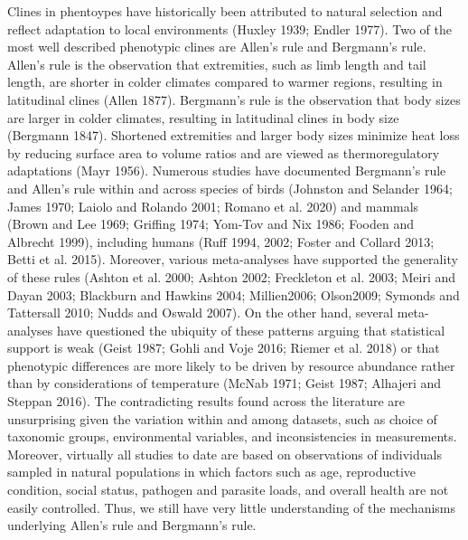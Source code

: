 \documentclass[]{article}
\begin{document}
Clines in phentoypes have historically been attributed to natural
selection and reflect adaptation to local environments (Huxley 1939;
Endler 1977). Two of the most well described phenotypic clines are
Allen's rule and Bergmann's rule. Allen's rule is the observation that
extremities, such as limb length and tail length, are shorter in colder
climates compared to warmer regions, resulting in latitudinal clines
(Allen 1877). Bergmann's rule is the observation that body sizes are
larger in colder climates, resulting in latitudinal clines in body size
(Bergmann 1847). Shortened extremities and larger body sizes minimize
heat loss by reducing surface area to volume ratios and are viewed as
thermoregulatory adaptations (Mayr 1956). Numerous studies have
documented Bergmann's rule and Allen's rule within and across species of
birds (Johnston and Selander 1964; James 1970; Laiolo and Rolando 2001;
Romano et al. 2020) and mammals (Brown and Lee 1969; Griffing 1974;
Yom-Tov and Nix 1986; Fooden and Albrecht 1999), including humans (Ruff
1994, 2002; Foster and Collard 2013; Betti et al. 2015). Moreover,
various meta-analyses have supported the generality of these rules
(Ashton et al. 2000; Ashton 2002; Freckleton et al. 2003; Meiri and
Dayan 2003; Blackburn and Hawkins 2004; Millien2006; Olson2009; Symonds
and Tattersall 2010; Nudds and Oswald 2007). On the other hand, several
meta-analyses have questioned the ubiquity of these patterns arguing
that statistical support is weak (Geist 1987; Gohli and Voje 2016;
Riemer et al. 2018) or that phenotypic differences are more likely to be
driven by resource abundance rather than by considerations of
temperature (McNab 1971; Geist 1987; Alhajeri and Steppan 2016). The
contradicting results found across the literature are unsurprising given
the variation within and among datasets, such as choice of taxonomic
groups, environmental variables, and inconsistencies in measurements.
Moreover, virtually all studies to date are based on observations of
individuals sampled in natural populations in which factors such as age,
reproductive condition, social status, pathogen and parasite loads, and
overall health are not easily controlled. Thus, we still have very
little understanding of the mechanisms underlying Allen's rule and
Bergmann's rule.
\end{document}
